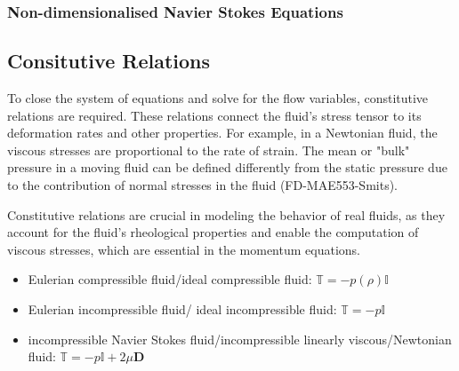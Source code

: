 \subsubsection{Non-dimensionalised Navier Stokes Equations}
\subsection{Consitutive Relations}
To close the system of equations and solve for the flow variables, constitutive relations are required. These relations 
connect the fluid's stress tensor to its deformation rates and other properties. For example, in a Newtonian fluid, the 
viscous stresses are proportional to the rate of strain. The mean or "bulk" pressure in a moving fluid can be defined 
differently from the static pressure due to the contribution of normal stresses in the fluid (FD-MAE553-Smits).

Constitutive relations are crucial in modeling the behavior of real fluids, as they account for the fluid's rheological 
properties and enable the computation of viscous stresses, which are essential in the momentum equations.
\begin{itemize}
    \item Eulerian compressible fluid/ideal compressible fluid: $\mathbf{\mathbb{T}} = -p(\rho)\mathbf{\mathbb{I}}$
    \item Eulerian incompressible fluid/ ideal incompressible fluid: $\mathbf{\mathbb{T}} = -p\mathbf{\mathbb{I}}$
    \item incompressible Navier Stokes fluid/incompressible linearly viscous/Newtonian fluid: $\mathbf{\mathbb{T}} = -p\mathbf{\mathbb{I}} + 2\mu\mathbf{D}$
\end{itemize}~\cite{truesdellIntroductionMechanicsFluids2000}
